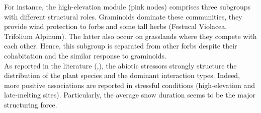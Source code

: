 \documentclass[10pt,a4paper]{article}
\begin{document}
For instance, the high-elevation module (pink nodes) comprises three subgroups with different structural roles. Graminoids dominate these communities, they provide wind protection to forbs and some tall herbs (Festucal Violacea, Trifolium Alpinum). The latter also occur on grasslands where they compete with each other. Hence, this subgroup is separated from other forbs despite their cohabitation and the similar response to graminoids.\\ 

As reported in the literature (\cite{callaway2002positive},\cite{choler2005consistent}), the abiotic stressors strongly structure the distribution of the plant species and the dominant interaction types. Indeed, more positive associations are reported in stressful conditions (high-elevation and late-melting sites). Particularly, the average snow duration seems to be the major structuring force. 
     
\end{document}
